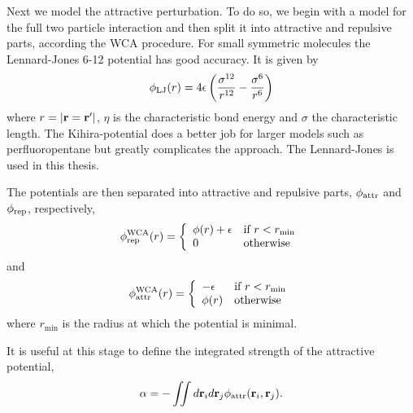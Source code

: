 
Next we model the attractive perturbation. 
To do so, we begin with a model for the full two particle interaction 
and then split it into attractive and repulsive parts, according the WCA procedure.
For small symmetric molecules the Lennard-Jones 6-12 potential has good accuracy.
It is given by
\begin{align}
  \phi_{\textrm{LJ}}(r) = 4\epsilon\left( \frac{\sigma^{12}}{r^{12}} - \frac{\sigma^{6}}{r^{6}} \right)
  \label{eqn:nuc:LJ}
\end{align}
where $r = \left| \textbf{r}=\textbf{r}^\prime \right|$, $\eta$ is the characteristic bond energy 
and $\sigma$ the characteristic length.
The Kihira-potential does a better job for larger models such as perfluoropentane 
but greatly complicates the approach.
The Lennard-Jones is used  in this thesis.


The potentials are then separated into attractive and repulsive parts, $\phi_{\text{attr}}$ and $\phi_{\text{rep}}$, respectively,
\begin{align}
  \phi_{\text{rep}}^{\text{WCA}}(r) = \left\{
    \begin{array}{ll}
      \phi(r) +  \epsilon & \text{if $r<r_{\textrm{min}}$}\\
      0 & \text{otherwise}
    \end{array} \right. 
\end{align}
and 
\begin{align}
  \phi_{\text{attr}}^{\text{WCA}}(r) = \left\{ 
    \begin{array}{ll}
      - \epsilon & \text{if $r<r_{\textrm{min}}$}\\
      \phi(r) & \text{otherwise}
    \end{array} \right.
\end{align}
where $r_\min$ is the radius at which the potential is minimal.

It is useful at this stage to define the integrated strength of the attractive potential, 
\begin{align}
  \alpha =  - \iint d \textbf{r}_i d\textbf{r}_j \phi_{\text{attr}}( \textbf{r}_i, \textbf{r}_j).
  \label{eqn:nuc:alpha}
\end{align}


